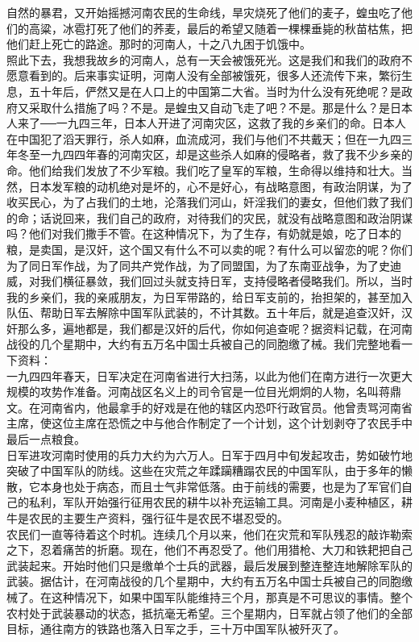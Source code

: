 自然的暴君，又开始摇撼河南农民的生命线，旱灾烧死了他们的麦子，蝗虫吃了他们的高粱，冰雹打死了他们的荞麦，最后的希望又随着一棵棵垂毙的秋苗枯焦，把他们赶上死亡的路途。那时的河南人，十之八九困于饥饿中。\\

照此下去，我想我故乡的河南人，总有一天会被饿死光。这是我们和我们的政府不愿意看到的。后来事实证明，河南人没有全部被饿死，很多人还流传下来，繁衍生息，五十年后，俨然又是在人口上的中国第二大省。当时为什么没有死绝呢？是政府又采取什么措施了吗？不是。是蝗虫又自动飞走了吧？不是。那是什么？是日本人来了{\Add ──}一九四三年，日本人开进了河南灾区，这救了我的乡亲们的命。日本人在中国犯了滔天罪行，杀人如麻，血流成河，我们与他们不共戴天；但在一九四三年冬至一九四四年春的河南灾区，却是这些杀人如麻的侵略者，救了我不少乡亲的命。他们给我们发放了不少军粮。我们吃了皇军的军粮，生命得以维持和壮大。当然，日本发军粮的动机绝对是坏的，心不是好心，有战略意图，有政治阴谋，为了收买民心，为了占我们的土地，沦落我们河山，奸淫我们的妻女，但他们救了我们的命；话说回来，我们自己的政府，对待我们的灾民，就没有战略意图和政治阴谋吗？他们对我们撒手不管。在这种情况下，为了生存，有奶就是娘，吃了日本的粮，是卖国，是汉奸，这个国又有什么不可以卖的呢？有什么可以留恋的呢？你们为了同日军作战，为了同共产党作战，为了同盟国，为了东南亚战争，为了史迪威，对我们横征暴敛，我们回过头就支持日军，支持侵略者侵略我们。所以，当时我的乡亲们，我的亲戚朋友，为日军带路的，给日军支前的，抬担架的，甚至加入队伍、帮助日军去解除中国军队武装的，不计其数。五十年后，就是追查汉奸，汉奸那么多，遍地都是，我们都是汉奸的后代，你如何追查呢？据资料记载，在河南战役的几个星期中，大约有五万名中国士兵被自己的同胞缴了械。我们完整地看一下资料：\\

一九四四年春天，日军决定在河南省进行大扫荡，以此为他们在南方进行一次更大规模的攻势作准备。河南战区名义上的司令官是一位目光炯炯的人物，名叫蒋鼎文。在河南省内，他最拿手的好戏是在他的辖区内恐吓行政官员。他曾责骂河南省主席，使这位主席在恐慌之中与他合作制定了一个计划，这个计划剥夺了农民手中最后一点粮食。\\

日军进攻河南时使用的兵力大约为六万人。日军于四月中旬发起攻击，势如破竹地突破了中国军队的防线。这些在灾荒之年蹂躏糟蹋农民的中国军队，由于多年的懒散，它本身也处于病态，而且士气非常低落。由于前线的需要，也是为了军官们自己的私利，军队开始强行征用农民的耕牛以补充运输工具。河南是小麦种植区，耕牛是农民的主要生产资料，强行征牛是农民不堪忍受的。\\

农民们一直等待着这个时机。连续几个月以来，他们在灾荒和军队残忍的敲诈勒索之下，忍着痛苦的折磨。现在，他们不再忍受了。他们用猎枪、大刀和铁耙把自己武装起来。开始时他们只是缴单个士兵的武器，最后发展到整连整连地解除军队的武装。据估计，在河南战役的几个星期中，大约有五万名中国士兵被自己的同胞缴械了。在这种情况下，如果中国军队能维持三个月，那真是不可思议的事情。整个农村处于武装暴动的状态，抵抗毫无希望。三个星期内，日军就占领了他们的全部目标，通往南方的铁路也落入日军之手，三十万中国军队被歼灭了。\\

